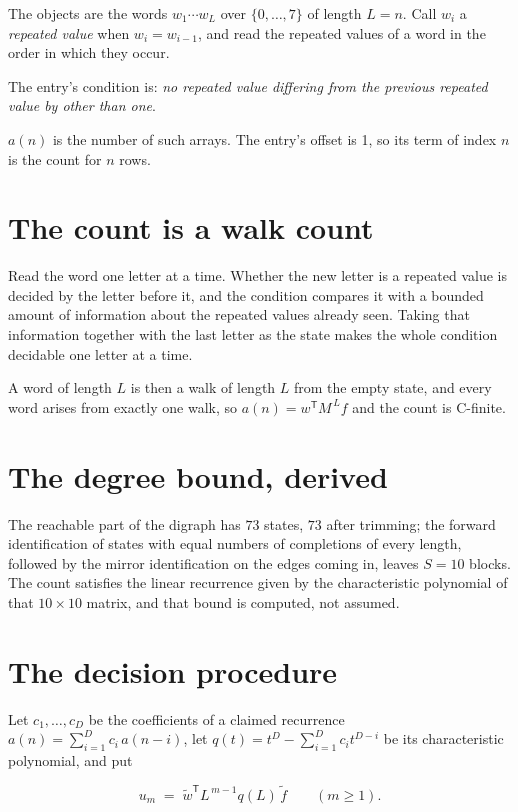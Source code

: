 \documentclass[11pt]{article}
\theoremstyle{definition}
\begin{document}
The objects are the words $w_1\cdots w_L$ over $\{0,\dots,7\}$ of length $L = n$. Call $w_i$ a {\itshape repeated value} when $w_i = w_{i-1}$, and read the repeated values of a word in the order in which they occur.

The entry's condition is: {\itshape no repeated value differing from the previous repeated value by other than one}.

$a(n)$ is the number of such arrays. The entry's offset is 1, so its term of index $n$ is the count for $n$ rows.

\section{The count is a walk count}

Read the word one letter at a time. Whether the new letter is a repeated value is decided by the letter before it, and the condition compares it with a bounded amount of information about the repeated values already seen. Taking that information together with the last letter as the state makes the whole condition decidable one letter at a time.

A word of length $L$ is then a walk of length $L$ from the empty state, and every word arises from exactly one walk, so $a(n) = w^{\mathsf T}M^{\,L}f$ and the count is C-finite.

\section{The degree bound, derived}

The reachable part of the digraph has $73$ states, $73$ after trimming; the forward identification of states with equal numbers of completions of every length, followed by the mirror identification on the edges coming in, leaves $S = 10$ blocks. The count satisfies the linear recurrence given by the characteristic polynomial of that $10\times10$ matrix, and that bound is computed, not assumed.

\section{The decision procedure}

Let $c_1,\dots,c_D$ be the coefficients of a claimed recurrence $a(n) = \sum_{i=1}^{D} c_i\,a(n-i)$, let $q(t) = t^{D} - \sum_{i=1}^{D} c_i t^{D-i}$ be its characteristic polynomial, and put

\[u_m \;=\; \tilde w^{\mathsf T} L^{\,m-1} q(L)\,\tilde f \qquad (m \ge 1).\]
\end{document}
